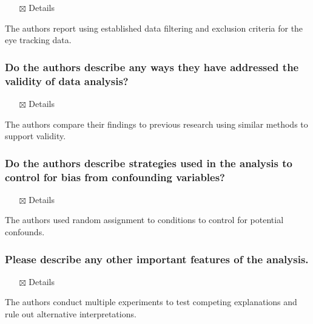 \documentclass[
  doc, a4paper]{apa7}
\providecommand{\tightlist}{%
  \setlength{\itemsep}{0pt}\setlength{\parskip}{0pt}}
\begin{document}
\begin{itemize}
\tightlist
\item[$\boxtimes$]
  Details
\end{itemize}

The authors report using established data filtering and exclusion criteria for the eye tracking data.

\subsubsection{Do the authors describe any ways they have addressed the validity of data analysis?}\label{do-the-authors-describe-any-ways-they-have-addressed-the-validity-of-data-analysis}

\begin{itemize}
\tightlist
\item[$\boxtimes$]
  Details
\end{itemize}

The authors compare their findings to previous research using similar methods to support validity.

\subsubsection{Do the authors describe strategies used in the analysis to control for bias from confounding variables?}\label{do-the-authors-describe-strategies-used-in-the-analysis-to-control-for-bias-from-confounding-variables}

\begin{itemize}
\tightlist
\item[$\boxtimes$]
  Details
\end{itemize}

The authors used random assignment to conditions to control for potential confounds.

\subsubsection{Please describe any other important features of the analysis.}\label{please-describe-any-other-important-features-of-the-analysis.}

\begin{itemize}
\tightlist
\item[$\boxtimes$]
  Details
\end{itemize}

The authors conduct multiple experiments to test competing explanations and rule out alternative interpretations.
\end{document}
